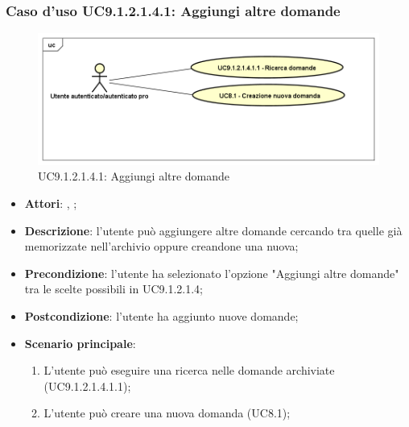 						\subsubsection{Caso d'uso UC9.1.2.1.4.1: Aggiungi altre domande}
						\label{UC9.1.2.1.4.1}
						\begin{figure}[h]
							\centering
						\includegraphics[scale=0.5,keepaspectratio]{UML/UC9_1_2_1_4_1.png}
							\caption{UC9.1.2.1.4.1: Aggiungi altre domande}
						\end{figure}
						\FloatBarrier
						\begin{itemize}
							\item \textbf{Attori}: \uau, \uaupro;
							\item \textbf{Descrizione}: l'utente può aggiungere altre domande cercando tra quelle già memorizzate nell'archivio oppure creandone una nuova; 
							\item \textbf{Precondizione}: l'utente ha selezionato l'opzione "Aggiungi altre domande" tra le scelte possibili in UC9.1.2.1.4;
							\item \textbf{Postcondizione}: l'utente ha aggiunto nuove domande;
							\item \textbf{Scenario principale}:
								\begin{enumerate}
									\item L'utente può eseguire una ricerca nelle domande archiviate (UC9.1.2.1.4.1.1);
									\item L'utente può creare una nuova domanda (UC8.1);
								\end{enumerate}
						\end{itemize}
						
